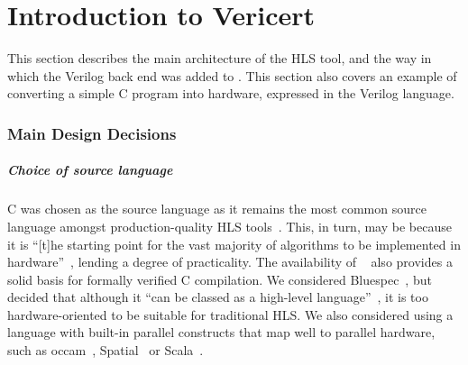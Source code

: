 \chapter{Introduction to Vericert}%
\label{sec:introduction-to-vericert}

This section describes the main architecture of the HLS tool, and the way in which the Verilog back end was added to \compcert{}.  This section also covers an example of converting a simple C program into hardware, expressed in the Verilog language.

\subsection{Main Design Decisions}

\paragraph{Choice of source language}
C was chosen as the source language as it remains the most common source language amongst production-quality HLS tools~\cite{canis11_legup, xilinx20_vivad_high_synth, intel_hls, bambu_hls}. This, in turn, may be because it is ``[t]he starting point for the vast majority of algorithms to be implemented in hardware''~\cite{5522874}, lending a degree of practicality.
The availability of \compcert{}~\cite{leroy09_formal_verif_realis_compil} also provides a solid basis for formally verified C compilation.
We considered Bluespec~\cite{nikhil04_blues_system_veril}, but decided that although it ``can be classed as a high-level language''~\cite{greaves_note}, it is too hardware-oriented to be suitable for traditional HLS.
We also considered using a language with built-in parallel constructs that map well to parallel hardware, such as occam~\cite{page91_compil_occam}, Spatial~\cite{spatial} or Scala~\cite{chisel}.


